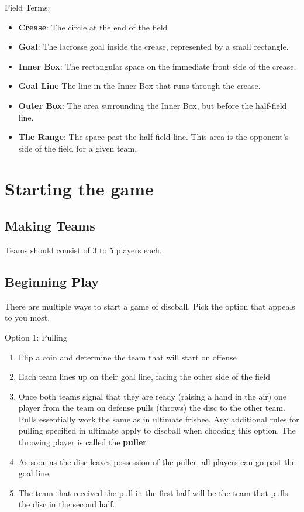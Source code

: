 \documentclass[10pt]{article}
\begin{document}
    Field Terms:
    \begin{itemize}
        \item \textbf{Crease}: The circle at the end of the field
        \item \textbf{Goal}: The lacrosse goal inside the crease, represented by a small rectangle.
        \item \textbf{Inner Box}: The rectangular space on the immediate front side of the crease.
        \item \textbf{Goal Line} The line in the Inner Box that runs through the crease.
        \item \textbf{Outer Box}: The area surrounding the Inner Box, but before the half-field line.
        \item \textbf{The Range}: The space past the half-field line. This area is the opponent's side of the field for a given team.
    \end{itemize}

    \section{Starting the game}
    \subsection{Making Teams}

    Teams should consist of 3 to 5 players each.

    \subsection{Beginning Play}
    There are multiple ways to start a game of discball. Pick the option that appeals to you most.
    
    \vspace{5pt}

    Option 1: Pulling
    \begin{enumerate}
        \item Flip a coin and determine the team that will start on offense
        \item Each team lines up on their goal line, facing the other side of the field
        \item Once both teams signal that they are ready (raising a hand in the air) one player from the team on defense pulls (throws) the disc to the other team. Pulls essentially work the same as in ultimate frisbee. Any additional rules for pulling specified in ultimate apply to discball when choosing this option. The throwing player is called the \textbf{puller}
        \item As soon as the disc leaves possession of the puller, all players can go past the goal line.
        \item The team that received the pull in the first half will be the team that pulls the disc in the second half.
    \end{enumerate}
\end{document}
